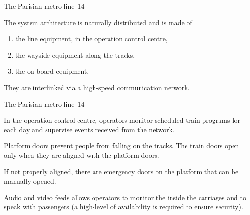 \documentclass[compress,dvipdfmx]{beamer}
\begin{document}
\begin{frame}{The Parisian metro line~14}

  The system architecture is naturally distributed and is made of
  \begin{enumerate}

    \item the line equipment, in the operation control centre,

    \item the wayside equipment along the tracks,

    \item the on\hyp{}board equipment.

  \end{enumerate}

  \bigskip

  They are interlinked via a high\hyp{}speed communication network.

\end{frame}


\begin{frame}{The Parisian metro line~14}

  In the operation control centre, operators monitor scheduled train
  programs for each day and supervise events received from the
  network.

  \bigskip

  Platform doors prevent people from falling on the tracks. The train
  doors open only when they are aligned with the platform doors.

  \bigskip

  If not properly aligned, there are emergency doors on the platform
  that can be manually opened.

  \bigskip

  Audio and video feeds allows operators to monitor the inside the
  carriages and to speak with passengers (a high\hyp{}level of
  availability is required to ensure security).

\end{frame}
\end{document}
